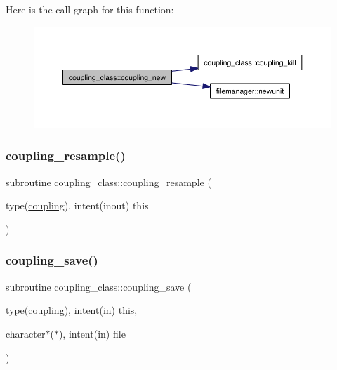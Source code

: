 Here is the call graph for this function\+:\nopagebreak
\begin{figure}[H]
\begin{center}
\leavevmode
\includegraphics[width=350pt]{namespacecoupling__class_a5fa07e475bf96111bc76820037fc26a4_cgraph}
\end{center}
\end{figure}
\mbox{\label{namespacecoupling__class_ad26da11333ea64f68c25250a35287a51}} 
\subsubsection{\texorpdfstring{coupling\+\_\+resample()}{coupling\_resample()}}
{\footnotesize\ttfamily subroutine coupling\+\_\+class\+::coupling\+\_\+resample (\begin{DoxyParamCaption}\item[{type(\hyperlink{structcoupling__class_1_1coupling}{coupling}), intent(inout)}]{this }\end{DoxyParamCaption})\hspace{0.3cm}{\ttfamily [private]}}

\mbox{\label{namespacecoupling__class_af46ffcc2d49425d21e248f173b5377bd}} 
\subsubsection{\texorpdfstring{coupling\+\_\+save()}{coupling\_save()}}
{\footnotesize\ttfamily subroutine coupling\+\_\+class\+::coupling\+\_\+save (\begin{DoxyParamCaption}\item[{type(\hyperlink{structcoupling__class_1_1coupling}{coupling}), intent(in)}]{this,  }\item[{character$\ast$($\ast$), intent(in)}]{file }\end{DoxyParamCaption})\hspace{0.3cm}{\ttfamily [private]}}

